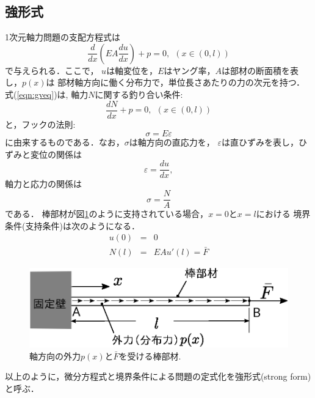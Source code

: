 \documentclass[10pt,a4j]{jarticle}
\begin{document}
\subsection{強形式}
1次元軸力問題の支配方程式は
\begin{equation}
	\frac{d}{dx}\left(EA \frac{du}{dx}\right) + p =0, \ \ \left(x\in (0,l)\right)
	\label{eqn:gveq}
\end{equation}
で与えられる．ここで，
$u$は軸変位を，$E$はヤング率，$A$は部材の断面積を表し，$p(x)$は
部材軸方向に働く分布力で，単位長さあたりの力の次元を持つ．
式(\ref{eqn:gveq})は, 軸力$N$に関する釣り合い条件:
\begin{equation}
	\frac{dN}{dx}+p=0, \ \ \left(x\in (0,l)\right)
	\label{eqn:equiv_N}
\end{equation}
と，フックの法則:
\begin{equation}
	\sigma=E\varepsilon
	\label{eqn:Hooke}
\end{equation}
に由来するものである．なお，$\sigma$は軸方向の直応力を，
$\varepsilon$は直ひずみを表し，ひずみと変位の関係は
\begin{equation}
	\varepsilon = \frac{du}{dx},
	\label{eqn:dudx}
\end{equation}
軸力と応力の関係は
\begin{equation}
	\sigma=\frac{N}{A}
\end{equation}
である．
棒部材が図\ref{fig:fig1_1}のように支持されている場合，$x=0$と$x=l$における
境界条件(支持条件)は次のようになる．
\begin{eqnarray}
	u (0) &= & 0 
	\label{eqn:BC_u}
	\\
	N (l) &= & EA u'(l)=\bar F 
	\label{eqn:BC_N}
\end{eqnarray}
\begin{figure}[h]
	\begin{center}
	\includegraphics[width=0.4\linewidth]{fig1_1.eps} 
	\end{center}
	\caption{軸方向の外力$p(x)$と$\bar F$を受ける棒部材.} 
	\label{fig:fig1_1}
\end{figure}
以上のように，微分方程式と境界条件による問題の定式化を強形式(strong form)と呼ぶ．
\end{document}
